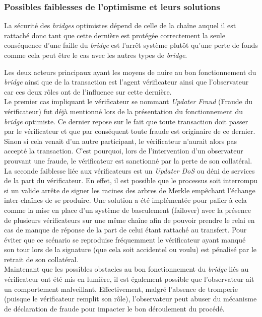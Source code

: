 \subsubsection{Possibles faiblesses de l’optimisme et leurs solutions}

La sécurité des \textit{bridges} optimistes dépend de celle de la chaîne auquel il est rattaché donc tant que cette dernière est protégée correctement la seule conséquence d’une faille du \textit{bridge} est l’arrêt système plutôt qu’une perte de fonds comme cela peut être le cas avec les autres types de \textit{bridge}.

Les deux acteurs principaux ayant les moyens de nuire au bon fonctionnement du \textit{bridge} ainsi que de la transaction est l’agent vérificateur ainsi que l’observateur car ces deux rôles ont de l’influence sur cette dernière. \\

Le premier cas impliquant le vérificateur se nommant \textit{Updater Fraud} (Fraude du vérificateur)  fut déjà mentionné lors de la présentation du fonctionnement du \textit{bridge} optimiste. Ce dernier repose sur le fait que toute transaction doit passer par le vérificateur et que par conséquent toute fraude est originaire de ce dernier. Sinon si cela venait d’un autre participant, le vérificateur n’aurait alors pas accepté la transaction. C’est pourquoi, lors de l’intervention d’un observateur prouvant une fraude, le vérificateur est sanctionné par la perte de son collatéral. \\

La seconde faiblesse liée aux vérificateurs est un \textit{Updater DoS} ou déni de services de la part du vérificateur. En effet, il est possible que le processus soit interrompu si un valide arrête de signer les racines des arbres de Merkle empêchant l'échange inter-chaînes de se produire.
Une solution a été implémentée pour palier à cela comme la mise en place d’un système de basculement (failover) avec la présence de plusieurs vérificateurs sur une même chaîne afin de pouvoir prendre le relai en cas de manque de réponse de la part de celui étant rattaché au transfert.  Pour éviter que ce scénario se reproduise fréquemment le vérificateur ayant manqué son tour lors de la signature (que cela soit accidentel ou voulu) est pénalisé par le retrait de son collatéral. \\

Maintenant que les possibles obstacles au bon fonctionnement du \textit{bridge} liés au vérificateur ont été mis en lumière, il est également possible que l’observateur ait un comportement malveillant.  Effectivement, malgré l’absence de tromperie (puisque le vérificateur remplit son rôle), l’observateur peut abuser du mécanisme de déclaration de fraude pour impacter le bon déroulement du procédé. \\

